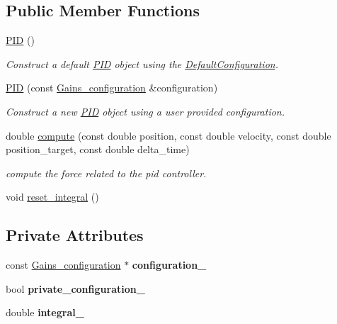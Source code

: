 \subsection*{Public Member Functions}
\begin{DoxyCompactItemize}
\item 
\mbox{\label{classci__example__cpp_1_1PID_a8e82fde951fff38658098ff84bbb5cbe}} 
\hyperlink{classci__example__cpp_1_1PID_a8e82fde951fff38658098ff84bbb5cbe}{P\+ID} ()
\begin{DoxyCompactList}\small\item\em Construct a default \hyperlink{classci__example__cpp_1_1PID}{P\+ID} object using the \hyperlink{classci__example__cpp_1_1DefaultConfiguration}{Default\+Configuration}. \end{DoxyCompactList}\item 
\hyperlink{classci__example__cpp_1_1PID_a5bbb703065bfd4c49b8d21e02d481c3d}{P\+ID} (const \hyperlink{classci__example__cpp_1_1Gains__configuration}{Gains\+\_\+configuration} \&configuration)
\begin{DoxyCompactList}\small\item\em Construct a new \hyperlink{classci__example__cpp_1_1PID}{P\+ID} object using a user provided configuration. \end{DoxyCompactList}\item 
double \hyperlink{classci__example__cpp_1_1PID_a75a4ccf0455e48e84af23e1d28b0337d}{compute} (const double position, const double velocity, const double position\+\_\+target, const double delta\+\_\+time)
\begin{DoxyCompactList}\small\item\em compute the force related to the pid controller. \end{DoxyCompactList}\item 
void \hyperlink{classci__example__cpp_1_1PID_a65d98fccd38cc385debc3d15670caf0e}{reset\+\_\+integral} ()
\end{DoxyCompactItemize}
\subsection*{Private Attributes}
\begin{DoxyCompactItemize}
\item 
\mbox{\label{classci__example__cpp_1_1PID_ad289b145cf9572e57c5c691c065643b7}} 
const \hyperlink{classci__example__cpp_1_1Gains__configuration}{Gains\+\_\+configuration} $\ast$ {\bfseries configuration\+\_\+}
\item 
\mbox{\label{classci__example__cpp_1_1PID_a005833b068e3b78b6715599859202ebe}} 
bool {\bfseries private\+\_\+configuration\+\_\+}
\item 
\mbox{\label{classci__example__cpp_1_1PID_aebc028e332ec559269e2623de62c4cea}} 
double {\bfseries integral\+\_\+}
\end{DoxyCompactItemize}


